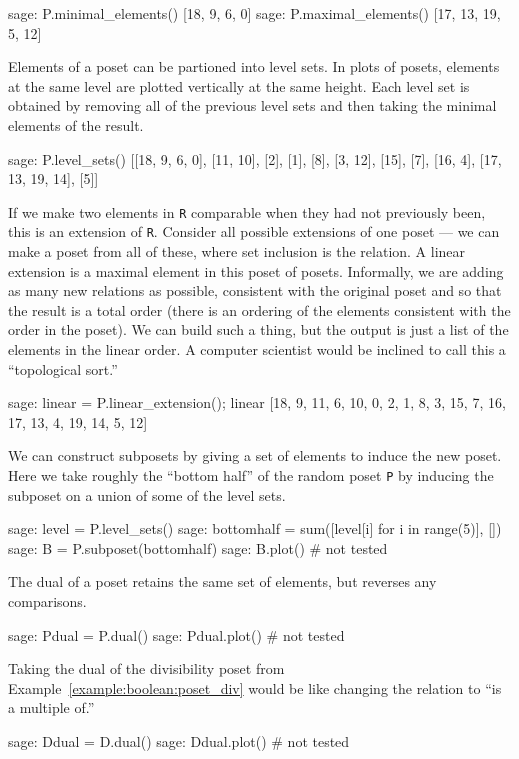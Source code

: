 %
\begin{sageexample}
sage: P.minimal_elements()
[18, 9, 6, 0]
sage: P.maximal_elements()
[17, 13, 19, 5, 12]
\end{sageexample}
%
Elements of a poset can be partioned into level sets.  In plots of posets, elements at the same level are plotted vertically at the same height.  Each level set is obtained by removing all of the previous level sets and then taking the minimal elements of the result.
%
\begin{sageexample}
sage: P.level_sets()
[[18, 9, 6, 0], [11, 10], [2], [1], [8], [3, 12],
 [15], [7], [16, 4], [17, 13, 19, 14], [5]]
\end{sageexample}
%
If we make two elements in \verb?R? comparable when they had not previously been, this is an extension of \verb?R?.  Consider all possible extensions of one poset --- we can make a poset from all of these, where set inclusion is the relation.  A linear extension is a maximal element in this poset of posets.  Informally, we are adding as many new relations as possible, consistent with the original poset and so that the result is a total order (there is an ordering of the elements  consistent with the order in the poset).  We can build such a thing, but the output is just a list of the elements in the linear order.  A computer scientist would be inclined to call this a ``topological sort.''\par
%
\begin{sageexample}
sage: linear = P.linear_extension(); linear
[18, 9, 11, 6, 10, 0, 2, 1, 8, 3, 15,
  7, 16, 17, 13, 4, 19, 14, 5, 12]
\end{sageexample}
%
We can construct subposets by giving a set of elements to induce the new poset.  Here we take roughly the ``bottom half'' of the random poset \verb?P?  by inducing the subposet on a union of some of the level sets.
%
\begin{sageexample}
sage: level = P.level_sets()
sage: bottomhalf = sum([level[i] for i in range(5)], [])
sage: B = P.subposet(bottomhalf)
sage: B.plot()    # not tested
\end{sageexample}
%
The dual of a poset retains the same set of elements, but reverses any comparisons.
%
\begin{sageexample}
sage: Pdual = P.dual()
sage: Pdual.plot()    # not tested
\end{sageexample}
%
Taking the dual of the divisibility poset from Example~\ref{example:boolean:poset_div} would be like changing the relation to ``is a multiple of.''
%
\begin{sageexample}
sage: Ddual = D.dual()
sage: Ddual.plot()    # not tested
\end{sageexample}
